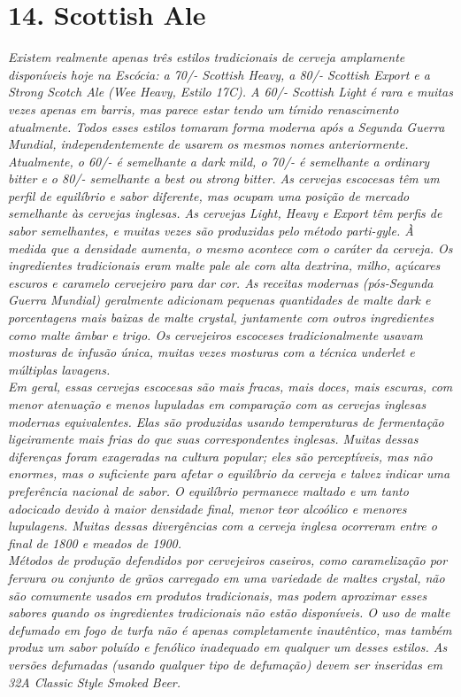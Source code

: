 \section*{14. Scottish Ale}
\textit{Existem realmente apenas três estilos tradicionais de cerveja amplamente disponíveis hoje na Escócia: a 70/- Scottish Heavy, a 80/- Scottish Export e a Strong Scotch Ale (Wee Heavy, Estilo 17C). A 60/- Scottish Light é rara e muitas vezes apenas em barris, mas parece estar tendo um tímido renascimento atualmente. Todos esses estilos tomaram forma moderna após a Segunda Guerra Mundial, independentemente de usarem os mesmos nomes anteriormente. Atualmente, o 60/- é semelhante a dark mild, o 70/- é semelhante a ordinary bitter e o 80/- semelhante a best ou strong bitter. As cervejas escocesas têm um perfil de equilíbrio e sabor diferente, mas ocupam uma posição de mercado semelhante às cervejas inglesas. As cervejas Light, Heavy e Export têm perfis de sabor semelhantes, e muitas vezes são produzidas pelo método parti-gyle. À medida que a densidade aumenta, o mesmo acontece com o caráter da cerveja. Os ingredientes tradicionais eram malte pale ale com alta dextrina, milho, açúcares escuros e caramelo cervejeiro para dar cor. As receitas modernas (pós-Segunda Guerra Mundial) geralmente adicionam pequenas quantidades de malte dark e porcentagens mais baixas de malte crystal, juntamente com outros ingredientes como malte âmbar e trigo. Os cervejeiros escoceses tradicionalmente usavam mosturas de infusão única, muitas vezes mosturas com a técnica underlet e múltiplas lavagens.}\\
\textit{Em geral, essas cervejas escocesas são mais fracas, mais doces, mais escuras, com menor atenuação e menos lupuladas em comparação com as cervejas inglesas modernas equivalentes. Elas são produzidas usando temperaturas de fermentação ligeiramente mais frias do que suas correspondentes inglesas. Muitas dessas diferenças foram exageradas na cultura popular; eles são perceptíveis, mas não enormes, mas o suficiente para afetar o equilíbrio da cerveja e talvez indicar uma preferência nacional de sabor. O equilíbrio permanece maltado e um tanto adocicado devido à maior densidade final, menor teor alcoólico e menores lupulagens. Muitas dessas divergências com a cerveja inglesa ocorreram entre o final de 1800 e meados de 1900.}\\
\textit{Métodos de produção defendidos por cervejeiros caseiros, como caramelização por fervura ou conjunto de grãos carregado em uma variedade de maltes crystal, não são comumente usados em produtos tradicionais, mas podem aproximar esses sabores quando os ingredientes tradicionais não estão disponíveis. O uso de malte defumado em fogo de turfa não é apenas completamente inautêntico, mas também produz um sabor poluído e fenólico inadequado em qualquer um desses estilos. As versões defumadas (usando qualquer tipo de defumação) devem ser inseridas em 32A Classic Style Smoked Beer. }\\
